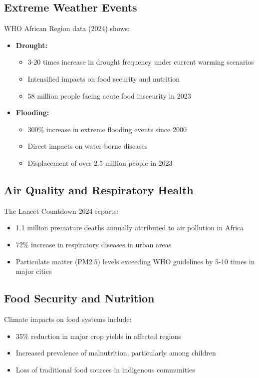 \subsection{Extreme Weather Events}
WHO African Region data (2024) shows:

\begin{itemize}
    \item \textbf{Drought:}
    \begin{itemize}
        \item 3-20 times increase in drought frequency under current warming scenarios
        \item Intensified impacts on food security and nutrition
        \item 58 million people facing acute food insecurity in 2023
    \end{itemize}
    
    \item \textbf{Flooding:}
    \begin{itemize}
        \item 300\% increase in extreme flooding events since 2000
        \item Direct impacts on water-borne diseases
        \item Displacement of over 2.5 million people in 2023
    \end{itemize}
\end{itemize}

\subsection{Air Quality and Respiratory Health}
The Lancet Countdown 2024 reports:

\begin{itemize}
    \item 1.1 million premature deaths annually attributed to air pollution in Africa
    \item 72\% increase in respiratory diseases in urban areas
    \item Particulate matter (PM2.5) levels exceeding WHO guidelines by 5-10 times in major cities
\end{itemize}

\subsection{Food Security and Nutrition}
Climate impacts on food systems include:

\begin{itemize}
    \item 35\% reduction in major crop yields in affected regions
    \item Increased prevalence of malnutrition, particularly among children
    \item Loss of traditional food sources in indigenous communities
\end{itemize}

